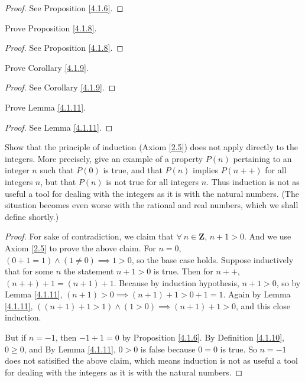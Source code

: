\begin{proof}
See Proposition \ref{4.1.6}.
\end{proof}

\begin{exercise}\label{ex 4.1.5}
Prove Proposition \ref{4.1.8}.
\end{exercise}

\begin{proof}
See Proposition \ref{4.1.8}.
\end{proof}

\begin{exercise}\label{ex 4.1.6}
Prove Corollary \ref{4.1.9}.
\end{exercise}

\begin{proof}
See Corollary \ref{4.1.9}.
\end{proof}

\begin{exercise}\label{ex 4.1.7}
Prove Lemma \ref{4.1.11}.
\end{exercise}

\begin{proof}
See Lemma \ref{4.1.11}.
\end{proof}

\begin{exercise}\label{ex 4.1.8}
Show that the principle of induction (Axiom \ref{2.5}) does not apply directly to the integers.
More precisely, give an example of a property \(P(n)\) pertaining to an integer \(n\) such that \(P(0)\) is true, and that \(P(n)\) implies \(P(n++)\) for all integers \(n\), but that \(P(n)\) is not true for all integers \(n\).
Thus induction is not as useful a tool for dealing with the integers as it is with the natural numbers.
(The situation becomes even worse with the rational and real numbers, which we shall define shortly.)
\end{exercise}

\begin{proof}
For sake of contradiction, we claim that \(\forall\ n \in \mathbf{Z}\), \(n + 1 > 0\).
And we use Axiom \ref{2.5} to prove the above claim.
For \(n = 0\), \((0 + 1 = 1) \land (1 \neq 0) \implies 1 > 0\), so the base case holds.
Suppose inductively that for some \(n\) the statement \(n + 1 > 0\) is true.
Then for \(n++\), \((n++) + 1 = (n + 1) + 1\).
Because by induction hypothesis, \(n + 1 > 0\), so by Lemma \ref{4.1.11}, \((n + 1) > 0 \implies (n + 1) + 1 > 0 + 1 = 1\).
Again by Lemma \ref{4.1.11}, \(((n + 1) + 1 > 1) \land (1 > 0) \implies (n + 1) + 1 > 0\), and this close induction.

But if \(n = -1\), then \(-1 + 1 = 0\) by Proposition \ref{4.1.6}.
By Definition \ref{4.1.10}, \(0 \geq 0\), and By Lemma \ref{4.1.11}, \(0 > 0\) is false because \(0 = 0\) is true.
So \(n = -1\) does not satisified the above claim, which means induction is not as useful a tool for dealing with the integers as it is with the natural numbers.
\end{proof}